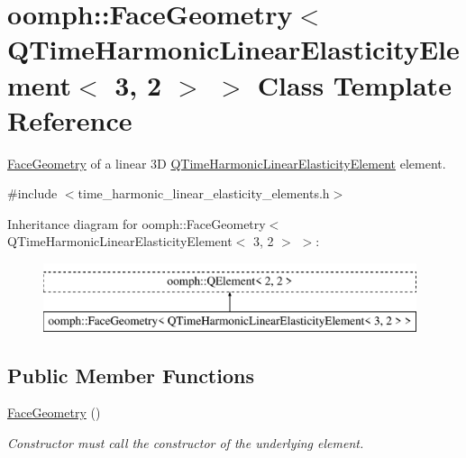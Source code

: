 \hypertarget{classoomph_1_1FaceGeometry_3_01QTimeHarmonicLinearElasticityElement_3_013_00_012_01_4_01_4}{}\section{oomph\+:\+:Face\+Geometry$<$ Q\+Time\+Harmonic\+Linear\+Elasticity\+Element$<$ 3, 2 $>$ $>$ Class Template Reference}
\label{classoomph_1_1FaceGeometry_3_01QTimeHarmonicLinearElasticityElement_3_013_00_012_01_4_01_4}


\hyperlink{classoomph_1_1FaceGeometry}{Face\+Geometry} of a linear 3D \hyperlink{classoomph_1_1QTimeHarmonicLinearElasticityElement}{Q\+Time\+Harmonic\+Linear\+Elasticity\+Element} element.  




{\ttfamily \#include $<$time\+\_\+harmonic\+\_\+linear\+\_\+elasticity\+\_\+elements.\+h$>$}

Inheritance diagram for oomph\+:\+:Face\+Geometry$<$ Q\+Time\+Harmonic\+Linear\+Elasticity\+Element$<$ 3, 2 $>$ $>$\+:\begin{figure}[H]
\begin{center}
\leavevmode
\includegraphics[height=2.000000cm]{classoomph_1_1FaceGeometry_3_01QTimeHarmonicLinearElasticityElement_3_013_00_012_01_4_01_4}
\end{center}
\end{figure}
\subsection*{Public Member Functions}
\begin{DoxyCompactItemize}
\item 
\hyperlink{classoomph_1_1FaceGeometry_3_01QTimeHarmonicLinearElasticityElement_3_013_00_012_01_4_01_4_a92bee65f5bbe86bf686cbacb9c65e97d}{Face\+Geometry} ()
\begin{DoxyCompactList}\small\item\em Constructor must call the constructor of the underlying element. \end{DoxyCompactList}\end{DoxyCompactItemize}


